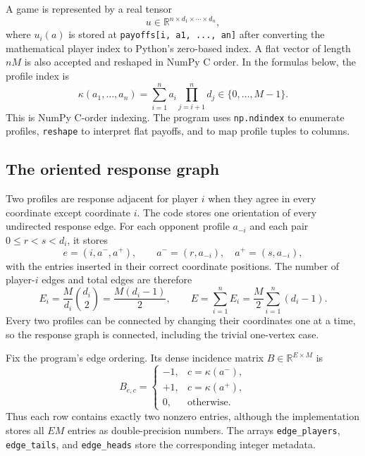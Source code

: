 \documentclass[11pt]{article}
\newcommand{\R}{\mathbb{R}}
\begin{document}
A game is represented by a real tensor
\[
 u\in\R^{n\times d_1\times\cdots\times d_n},
\]
where $u_i(a)$ is stored at \texttt{payoffs[i, a1, ..., an]} after converting
the mathematical player index to Python's zero-based index.  A flat vector of
length $nM$ is also accepted and reshaped in NumPy C order.  In the formulas
below, the profile index is
\[
 \kappa(a_1,\ldots,a_n)
 =\sum_{i=1}^n a_i\prod_{j=i+1}^n d_j
 \in\{0,\ldots,M-1\}.
\]
This is NumPy C-order indexing.  The program uses \texttt{np.ndindex} to
enumerate profiles, \texttt{reshape} to interpret flat payoffs, and
 to map profile tuples to columns.

\subsection{The oriented response graph}

Two profiles are response adjacent for player $i$ when they agree in every
coordinate except coordinate $i$.  The code stores one orientation of every
undirected response edge.  For each opponent profile $a_{-i}$ and each pair
$0\leq r<s<d_i$, it stores
\[
 e=(i,a^-,a^+),\qquad
 a^-=(r,a_{-i}),\quad a^+=(s,a_{-i}),
\]
with the entries inserted in their correct coordinate positions.  The number
of player-$i$ edges and total edges are therefore
\begin{equation}
 E_i=\frac{M}{d_i}\binom{d_i}{2}
    =\frac{M(d_i-1)}{2},\qquad
 E=\sum_{i=1}^nE_i
  =\frac{M}{2}\sum_{i=1}^n(d_i-1).
 \label{eq:edge-count}
\end{equation}
Every two profiles can be connected by changing their coordinates one at a
time, so the response graph is connected, including the trivial one-vertex
case.

Fix the program's edge ordering.  Its dense incidence matrix
$B\in\R^{E\times M}$ is
\begin{equation}
 B_{e,c}=
 \begin{cases}
 -1,&c=\kappa(a^-),\\
 +1,&c=\kappa(a^+),\\
 0,&\text{otherwise}.
 \end{cases}
 \label{eq:incidence}
\end{equation}
Thus each row contains exactly two nonzero entries, although the implementation
stores all $EM$ entries as double-precision numbers.  The arrays
\texttt{edge\_players}, \texttt{edge\_tails}, and \texttt{edge\_heads} store
the corresponding integer metadata.
\end{document}
